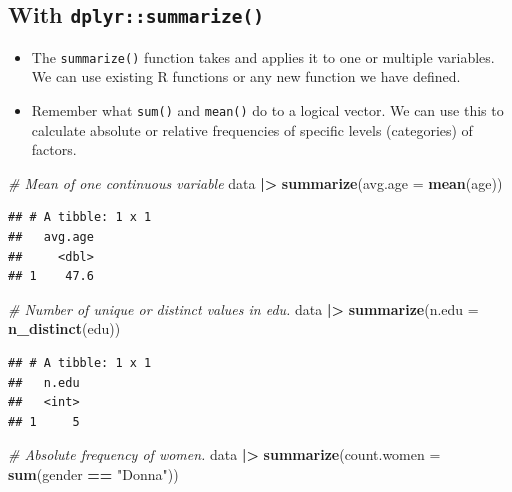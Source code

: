 \documentclass[
]{book}
\newenvironment{Shaded}{\begin{snugshade}}{\end{snugshade}}
\newcommand{\AttributeTok}[1]{\textcolor[rgb]{0.13,0.29,0.53}{#1}}
\newcommand{\CommentTok}[1]{\textcolor[rgb]{0.56,0.35,0.01}{\textit{#1}}}
\newcommand{\FunctionTok}[1]{\textcolor[rgb]{0.13,0.29,0.53}{\textbf{#1}}}
\newcommand{\NormalTok}[1]{#1}
\newcommand{\SpecialCharTok}[1]{\textcolor[rgb]{0.81,0.36,0.00}{\textbf{#1}}}
\newcommand{\StringTok}[1]{\textcolor[rgb]{0.31,0.60,0.02}{#1}}
\providecommand{\tightlist}{%
  \setlength{\itemsep}{0pt}\setlength{\parskip}{0pt}}
\begin{document}
\hypertarget{with-dplyrsummarize}{%
\subsection{\texorpdfstring{With \texttt{dplyr::summarize()}}{With dplyr::summarize()}}\label{with-dplyrsummarize}}

\begin{itemize}
\tightlist
\item
  The \texttt{summarize()} function takes and applies it to one or multiple variables. We can use existing R functions or any new function we have defined.
\item
  Remember what \texttt{sum()} and \texttt{mean()} do to a logical vector. We can use this to calculate absolute or relative frequencies of specific levels (categories) of factors.
\end{itemize}

\begin{Shaded}
\begin{Highlighting}[]
\CommentTok{\# Mean of one continuous variable}
\NormalTok{data }\SpecialCharTok{|\textgreater{}} 
  \FunctionTok{summarize}\NormalTok{(}\AttributeTok{avg.age =} \FunctionTok{mean}\NormalTok{(age))}
\end{Highlighting}
\end{Shaded}

\begin{verbatim}
## # A tibble: 1 x 1
##   avg.age
##     <dbl>
## 1    47.6
\end{verbatim}

\begin{Shaded}
\begin{Highlighting}[]
\CommentTok{\# Number of unique or distinct values in edu.}
\NormalTok{data }\SpecialCharTok{|\textgreater{}} 
  \FunctionTok{summarize}\NormalTok{(}\AttributeTok{n.edu =} \FunctionTok{n\_distinct}\NormalTok{(edu))}
\end{Highlighting}
\end{Shaded}

\begin{verbatim}
## # A tibble: 1 x 1
##   n.edu
##   <int>
## 1     5
\end{verbatim}

\begin{Shaded}
\begin{Highlighting}[]
\CommentTok{\# Absolute frequency of women.}
\NormalTok{data }\SpecialCharTok{|\textgreater{}} 
  \FunctionTok{summarize}\NormalTok{(}\AttributeTok{count.women =} \FunctionTok{sum}\NormalTok{(gender }\SpecialCharTok{==} \StringTok{"Donna"}\NormalTok{))}
\end{Highlighting}
\end{Shaded}
\end{document}
